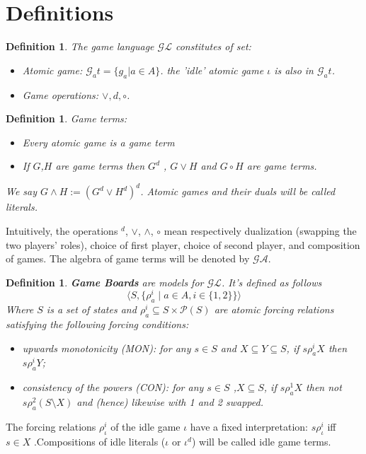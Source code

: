 \documentclass[10pt]{article}
\newcommand{\gl}{\mathcal{GL}}
\newcommand{\ga}{\mathcal{GA}}
\newtheorem{definition}[theorem]{Definition}
\begin{document}
	\section{Definitions}
	\begin{definition}
		The game language $\gl$ constitutes of set:
		\begin{itemize}
			\item Atomic game: $\mathcal{G}_at = \{g_a| a\in A\}$. the 'idle' atomic game $\iota$ is also in $\mathcal{G}_at$.
			
			\item Game operations: $\lor, d, \circ$.
		\end{itemize}
	\end{definition}
	\begin{definition}
		Game terms:
		\begin{itemize}
			\item Every atomic game is a game term
			\item If $G$,$H$ are game terms then $G^d$ , $G\lor H$ and $G\circ H$ are game terms.
		\end{itemize}
		
		We say $G \land H:= (G^d \lor H^d)^d$. Atomic games and their duals will be called literals.
	\end{definition}
	
	Intuitively, the operations $ ^d$, $\vee$, $\wedge$, $\circ$ mean respectively dualization (swapping the two players’ roles), choice of first player, choice of second player,
	and composition of games. The algebra of game terms will be denoted by $\ga$.
	\begin{definition}
		\textbf{Game Boards} are models for $\gl$. It's defined as follows
		\[\langle S, \{\rho^i_a \mid a \in A, i \in \{1,2\}\}  \rangle\]
		Where $S$ is a set of states and $\rho^i_a \subseteq S\times \mathcal{P}(S)$ are atomic forcing relations satisfying the following forcing conditions:
		\begin{itemize}
			\item upwards monotonicity (\textit{MON}): for any $s\in S$ and $X \subseteq Y \subseteq S$, if $s\rho^i_a X$ then $s\rho^i_aY$;
			\item consistency of the powers (\textit{CON}): for any $s\in S$ ,$X \subseteq S$, if $s \rho^1_a X$ then not $s\rho^2_a(S\setminus X)$ and (hence) likewise with 1 and 2 swapped.
		\end{itemize}
	\end{definition}
	
	The forcing relations $\rho^i_\iota$ of the idle game $\iota$ have a fixed interpretation:
	$s\rho_\iota^i$ iﬀ $s\in X$ .Compositions of idle literals ($\iota$ or $\iota^d$) will be called idle game terms.
	
\end{document}
